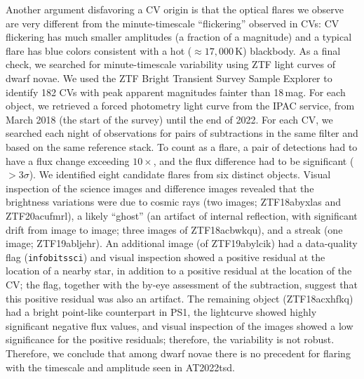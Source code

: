 \documentclass{nature_plusfigure}
\newcommand{\at}{AT2022tsd}
\begin{document}
\begin{methods}
Another argument disfavoring a CV origin is that the optical flares we observe are very different from the minute-timescale ``flickering'' observed in CVs: CV flickering has much smaller amplitudes (a fraction of a magnitude\cite{Bruch2021}) and a typical flare has blue colors consistent with a hot ($\approx17,000\,$K) blackbody\cite{Bruch2021}.
As a final check, we searched for minute-timescale variability using ZTF light curves of dwarf novae. 
We used the ZTF Bright Transient Survey\cite{FremlingBTS} Sample Explorer\cite{PerleyBTS} to identify 182 CVs with peak apparent magnitudes fainter than 18\,mag.
For each object, we retrieved a forced photometry light curve from the IPAC service\cite{Masci2019}, from March 2018 (the start of the survey) until the end of 2022. For each CV, we searched each night of observations for pairs of subtractions in the same filter and based on the same reference stack.
To count as a flare, a pair of detections had to have a flux change exceeding $10\times$, and the flux difference had to be significant ($>3\sigma$).
We identified eight candidate flares from six distinct objects. Visual inspection of the science images and difference images revealed that the brightness variations were due to cosmic rays (two images; ZTF18abyxlas and ZTF20acufmrl), a likely ``ghost'' (an artifact of internal reflection, with significant drift from image to image; three images of ZTF18acbwkqu), and a streak (one image; ZTF19abljehr). An additional image (of ZTF19abylcik) had a data-quality flag (\texttt{infobitssci}) and visual inspection showed a positive residual at the location of a nearby star, in addition to a positive residual at the location of the CV; the flag, together with the by-eye assessment of the subtraction, suggest that this positive residual was also an artifact. The remaining object (ZTF18acxhfkq) had a bright point-like counterpart in PS1, the lightcurve showed highly significant negative flux values, and visual inspection of the images showed a low significance for the positive residuals; therefore, the variability is not robust.  
Therefore, we conclude that among dwarf novae there is no precedent for flaring with the timescale and amplitude seen in \at.


\end{methods}
\end{document}
